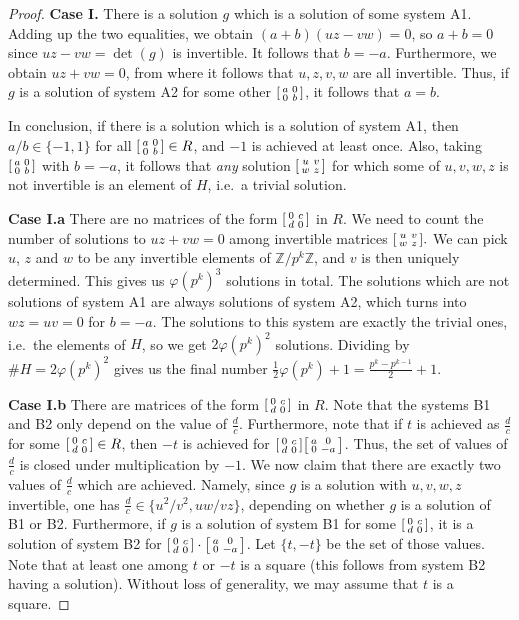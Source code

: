 \documentclass[10pt,leqno]{amsart}
\newcommand\sm[1]{\begin{bsmallmatrix}#1\end{bsmallmatrix}}
\newcommand{\Z}{\mathbb{Z}}
\theoremstyle{definition}
\theoremstyle{remark}
\numberwithin{theorem}{section}
\begin{document}
\begin{proof}
\noindent \textbf{Case I.} There is a solution $g$ which is a solution of some system A1. Adding up the two equalities, we obtain $(a+b)(uz-vw)=0$, so $a+b=0$ since $uz-vw=\det(g)$ is invertible. It follows that $b=-a$. Furthermore, we obtain $uz+vw=0$, from where it follows that $u,z,v,w$ are all invertible. Thus, if $g$ is a solution of system A2 for some other $\sm{a & 0 \\ 0 & b}$, it follows that $a=b$.

In conclusion, if there is a solution which is a solution of system A1, then $a/b\in\{-1,1\}$ for all $\sm{a & 0 \\ 0 & b} \in R$, and $-1$ is achieved at least once. Also, taking $\sm{a & 0 \\ 0 & b}$ with $b=-a$, it follows that \emph{any} solution $\sm{u & v \\ w & z}$ for which some of $u,v,w,z$ is not invertible is an element of $H$, i.e.\ a trivial solution.

\noindent \textbf{Case I.a} There are no matrices of the form $\sm{0 & c \\d & 0}$ in $R$. We need to count the number of solutions to $uz+vw=0$ among invertible matrices $\sm{u & v \\ w & z}.$ We can pick $u$, $z$ and $w$ to be any invertible elements of $\Z/p^k\Z$, and $v$ is then uniquely determined. This gives us $\varphi(p^k)^3$ solutions in total. The solutions which are not solutions of system A1 are always solutions of system A2, which turns into $wz=uv=0$ for $b=-a$. The solutions to this system are exactly the trivial ones, i.e.\ the elements of $H$, so we get $2\varphi(p^k)^2$ solutions. Dividing by $\#H=2\varphi(p^k)^2$ gives us the final number $\frac{1}{2}\varphi(p^k)+1=\frac{p^k-p^{k-1}}{2}+1$.

\noindent \textbf{Case I.b} There are matrices of the form $\sm{0 & c \\d & 0}$ in $R$.
Note that the systems B1 and B2 only depend on the value of $\frac{d}{c}$. Furthermore, note that if $t$ is achieved as $\frac{d}{c}$ for some $\sm{0 & c \\ d & 0} \in R$, then $-t$ is achieved for $\sm{0 & c \\ d & 0}\sm{a & 0 \\0 & -a}$. Thus, the set of values of $\frac{d}{c}$ is closed under multiplication by $-1$. We now claim that there are exactly two values of $\frac{d}{c}$ which are achieved. Namely, since $g$ is a solution with $u,v,w,z$ invertible, one has $\frac{d}{c} \in \{u^2/v^2, uw/vz\}$, depending on whether $g$ is a solution of B1 or B2. Furthermore, if $g$ is a solution of system B1 for some $\sm{0 & c \\d & 0}$, it is a solution of system B2 for $\sm{0 & c \\ d & 0}\cdot \sm{a & 0 \\0 & -a}$. Let $\{t, -t\}$ be the set of those values. Note that at least one among $t$ or $-t$ is a square (this follows from system B2 having a solution). Without loss of generality, we may assume that $t$ is a square.



\end{proof}
\end{document}
